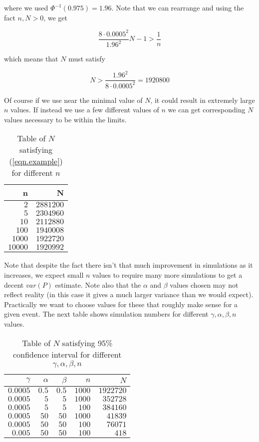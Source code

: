 \documentclass[
10pt, %
a4paper, %
oneside, %
headinclude,footinclude, %
BCOR5mm, %
]{scrartcl}
\begin{document}
where we used $\Phi^{-1}(0.975) = 1.96$. Note that we can rearrange and using
the fact $n, N > 0$, we get

$$ \frac{8 \cdot 0.0005^2}{1.96^2}  N - 1 > \frac{1}{n} $$

which means that $N$ must satisfy

$$ N > \frac{1.96^2}{8 \cdot 0.0005^2} = 1920800 $$

Of course if we use near the minimal value of $N$, it could result in extremely
large $n$ values. If instead we use a few different values of $n$ we can get
corresponding $N$ values necessary to be within the limits.

\begin{table}[hbt]
\caption{Table of $N$ satisfying (\ref{eqn.example}) for different $n$}
\centering
\begin{tabular}{rr}

n & N \\
\midrule
$2$ & $2881200$ \\
$5$ & $2304960$ \\
$10$ & $2112880$ \\
$100$ & $1940008$ \\
$1000$ & $1922720$ \\
$10000$ & $1920992$ \\
\bottomrule
\end{tabular}
\label{tab:label}
\end{table}


Note that despite the fact there isn't that much improvement in simulations as it increases, we expect small $n$ values to require many more simulations to get a decent $var(P)$ estimate. Note also that the $\alpha$ and $\beta$ values chosen may not reflect reality (in this case it gives a much larger variance than we would expect). Practically we want to choose values for these that roughly make sense for a given event. The next table shows simulation numbers for different $\gamma, \alpha, \beta, n$ values.

\begin{table}[hbt]
\caption{Table of $N$ satisfying 95\% confidence interval for different $\gamma, \alpha, \beta, n$}
\centering
\begin{tabular}{rrrrr}

$\gamma$ & $\alpha$ & $\beta$ & $n$ & $N$ \\
\midrule
$0.0005$ & $0.5$ & $0.5$ & $1000$ & $1922720$ \\
$0.0005$ & $5$ & $5$ & $1000$ & $352728$ \\
$0.0005$ & $5$ & $5$ & $100$ & $384160$ \\
$0.0005$ & $50$ & $50$ & $1000$ & $41839$ \\
$0.0005$ & $50$ & $50$ & $100$ & $76071$ \\
$0.005$ & $50$ & $50$ & $100$ & $418$ \\

\bottomrule
\end{tabular}
\label{tab:label}
\end{table}
\end{document}
